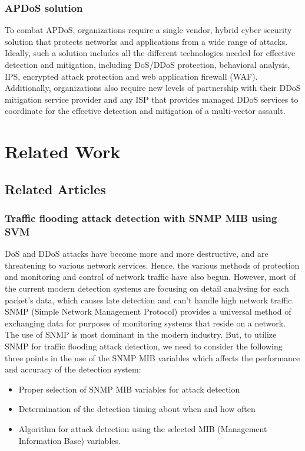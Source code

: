 \documentclass{report}
\begin{document}
\subsection {APDoS solution}

 \hfill \break To combat APDoS, organizations require a single vendor, hybrid cyber security solution that protects networks and applications from a wide range of attacks. Ideally, such a solution \cite{APDoSSolution} includes all the different technologies needed for effective detection and mitigation, including DoS/DDoS protection, behavioral analysis, IPS, encrypted attack protection and web application firewall (WAF). Additionally, organizations also require new levels of partnership with their DDoS mitigation service provider and any ISP that provides managed DDoS services to coordinate for the effective detection and mitigation of a multi-vector assault.

\newpage
\chapter {Related Work}
\section {Related Articles}
\subsection {Traffic flooding attack detection with SNMP MIB using SVM}
DoS and DDoS attacks have become more and more destructive, and are threatening to various network services. Hence, the various methods of protection and monitoring and control of network traffic have also begun.
However, most of the current modern detection systems are focusing on detail analysing for each packet’s data, which causes late detection and can’t handle high network traffic.
  \hfill \break
SNMP (Simple Network Management Protocol)\cite{snmp}  provides a universal method of exchanging data for purposes of monitoring systems that reside on a network. The use of SNMP is most dominant in the modern industry. But, to utilize SNMP for traffic flooding attack detection, we need to consider the following three points in the use of the SNMP MIB variables which affects the performance and accuracy of the detection system:
\begin{itemize}
\item Proper selection of SNMP MIB variables for attack detection
\item Determination of the detection timing about when and how often
\item Algorithm for attack detection using the selected MIB (Management Information Base) variables.
\end{itemize}
  \hfill \break
\end{document}
